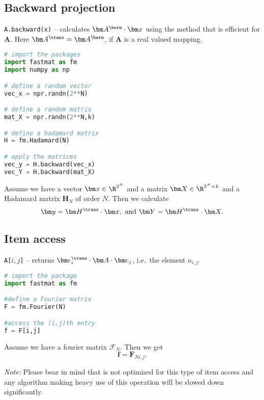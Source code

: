 %
%
%
\subsection{Backward projection}
\texttt{A.backward(x)} -- calculates $\bm A^\herm \cdot \bm x$ using the method that is efficient for $\bm A$. Here $\bm A^\trans = \bm A^\herm$, if $\bm A$ is a real valued mapping.

\begin{snippet}
\begin{lstlisting}[language=Python]
# import the packages
import fastmat as fm
import numpy as np

# define a random vector
vec_x = npr.randn(2**N)

# define a random matrix
mat_X = npr.randn(2**N,k)

# define a hadamard matrix
H = fm.Hadamard(N)

# apply the matrices
vec_y = H.backward(vec_x)
vec_Y = H.backward(mat_X)
\end{lstlisting}

Assume we have a vector $\bm x \in \R^{2^N}$ and a matrix $\bm X \in \R^{2^N \times k}$ and a Hadamard matrix $\mathcal{\bm H}_N$ of order $N$. Then we calculate
	\[\bm y = \bm H^\trans \cdot \bm  x, ~ \mathrm{and} ~ \bm Y = \bm H^\trans \cdot \bm X.\]
\end{snippet}

%
%
%
\subsection{Item access} 
\texttt{A[$i,j$]} -- returns $\bm e_i^\trans \cdot \bm A \cdot \bm e_j$, i.e.\ the element $a_{i,j}$.

\begin{snippet}
\begin{lstlisting}[language=Python]
# import the package
import fastmat as fm

#define a Fourier matrix
F = fm.Fourier(N)

#access the (i,j)th entry
f = F[i,j]
\end{lstlisting}

Assume we have a fourier matrix $\bm{\mathcal{F}}_N$. Then we get
	\[\bm f = \mathcal{\bm F}_{N {i,j}}.\]
\end{snippet}

\textit{Note:} Please bear in mind that \fm{} is not optimized for this type of item access and any algorithm making heavy use of this operation will be slowed down significantly.
%
%
%
